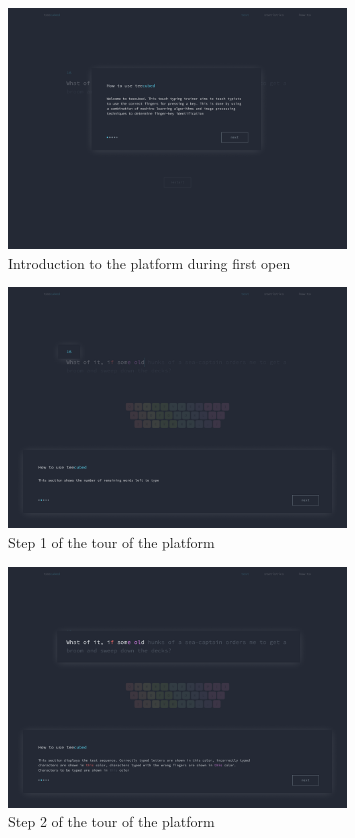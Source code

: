 \documentclass{report}
\begin{document}
\begin{figure}[H]
	\centering
	\includegraphics[width=0.8\textwidth]{frontend-guide-1.png}
	\caption{Introduction to the platform during first open}
	\centering
\end{figure}

\begin{figure}[H]
	\centering
	\includegraphics[width=0.8\textwidth]{frontend-guide-2.png}
	\caption{Step 1 of the tour of the platform}
	\centering
\end{figure}

\begin{figure}[H]
	\centering
	\includegraphics[width=0.8\textwidth]{frontend-guide-3.png}
	\caption{Step 2 of the tour of the platform}
	\centering
\end{figure}
\end{document}
